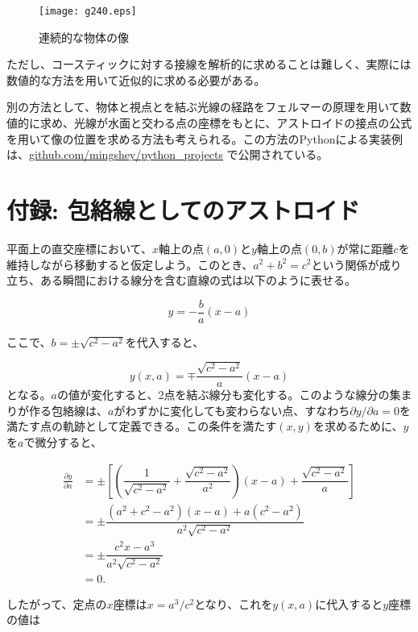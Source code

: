 \documentclass[twocolumn]{article}
\begin{document}
	\begin{figure}[ht]
		\centering
		\texttt{[image: g240.eps]}
		\caption{連続的な物体の像}
		\label{fig:extended_image}
	\end{figure}
	
	ただし、コースティックに対する接線を解析的に求めることは難しく、実際には数値的な方法を用いて近似的に求める必要がある。
	
	別の方法として、物体と視点とを結ぶ光線の経路をフェルマーの原理を用いて数値的に求め、光線が水面と交わる点の座標をもとに、アストロイドの接点の公式を用いて像の位置を求める方法も考えられる。この方法のPythonによる実装例は、\href{https://github.com/mingshey/python_projects/blob/main/Refraction_Image.ipynb}%
	{github.com/mingshey/python\_projects} で公開されている。
	
	\appendix
	\newcommand{\pd}[2]{{\frac{\partial #1}{\partial #2}}}
	\newcommand{\ilpd}[2]{{{\partial #1}/{\partial #2}}}
	\section*{付録: 包絡線としてのアストロイド}
	
	平面上の直交座標において、$x$軸上の点$(a, 0)$と$y$軸上の点$(0, b)$が常に距離$c$を維持しながら移動すると仮定しよう。このとき、$a^2+b^2=c^2$という関係が成り立ち、ある瞬間における線分を含む直線の式は以下のように表せる。
	
	$$y=-\dfrac{b}{a}(x-a)$$
	
	ここで、$b=\pm \sqrt{c^2-a^2}$を代入すると、
	
	$$y(x, a) = \mp \dfrac{\sqrt{c^2-a^2}}{a}(x-a)$$
%	
	となる。$a$の値が変化すると、2点を結ぶ線分も変化する。このような線分の集まりが作る包絡線は、$a$がわずかに変化しても変わらない点、すなわち$\ilpd{y}{a} = 0$を満たす点の軌跡として定義できる。この条件を満たす$(x, y)$を求めるために、$y$を$a$で微分すると、
	
	$$ \begin{aligned}
		\pd{y}{a} &= \pm\left[\left( \dfrac{1}{\sqrt{c^2-a^2}}+\dfrac{\sqrt{c^2-a^2}}{a^2}\right) (x-a) + \dfrac{\sqrt{c^2-a^2}}{a} \right]\\
		&= \pm \dfrac{(a^2+c^2-a^2)(x-a)+a(c^2-a^2)}{a^2\sqrt{c^2-a^2}}\\
		&= \pm \dfrac{c^2 x - a^3}{a^2 \sqrt{c^2 - a^2}}\\
		&= 0.
	\end{aligned}
	$$
	
	したがって、定点の$x$座標は$x = a^3/c^2$となり、これを$y(x, a)$に代入すると$y$座標の値は
	
\end{document}

